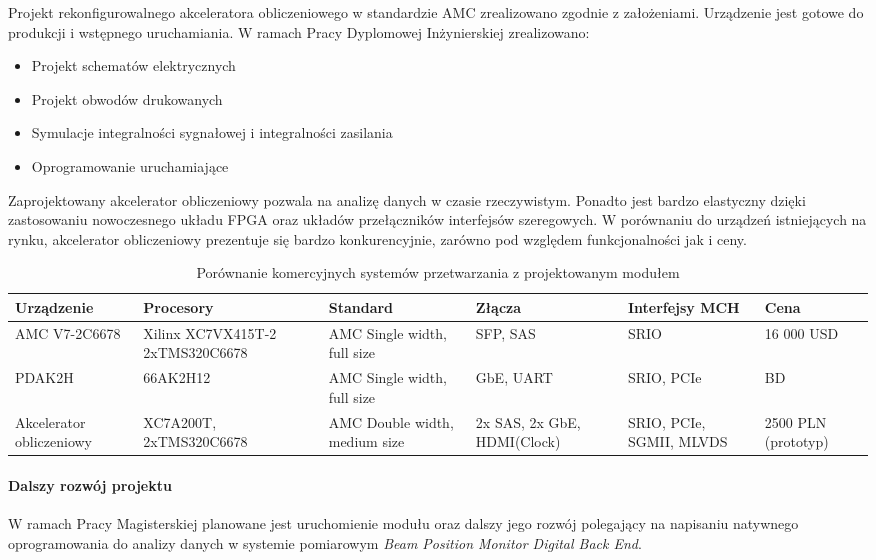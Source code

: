 

Projekt rekonfigurowalnego akceleratora obliczeniowego w standardzie AMC zrealizowano zgodnie z założeniami. Urządzenie jest gotowe do produkcji i wstępnego uruchamiania. W ramach Pracy Dyplomowej Inżynierskiej zrealizowano:
\begin{itemize}
\item
Projekt schematów elektrycznych
\item
Projekt obwodów drukowanych
\item
Symulacje integralności sygnałowej i integralności zasilania
\item
Oprogramowanie uruchamiające
\end{itemize}

Zaprojektowany akcelerator obliczeniowy pozwala na analizę danych w czasie rzeczywistym. Ponadto jest bardzo elastyczny dzięki zastosowaniu nowoczesnego układu FPGA oraz układów przełączników interfejsów szeregowych. W porównaniu do urządzeń istniejących na rynku, akcelerator obliczeniowy prezentuje się bardzo konkurencyjnie, zarówno pod względem funkcjonalności jak i ceny. 

\begin{table}[here]
\centering
\scriptsize
    \begin{tabular}{p{2.5cm}| p{2.5cm} | p{2.5cm}|p{2cm}|p{2cm}|p{1.5cm}}
	\toprule
    \textbf{Urządzenie} & \textbf{Procesory} & \textbf{Standard} & \textbf{Złącza}  & \textbf{Interfejsy MCH}  & \textbf{Cena}\\
    \midrule
    AMC V7-2C6678 	& 	Xilinx XC7VX415T-2  2xTMS320C6678  	& 	AMC Single width, full size		&	SFP, SAS		&	 	SRIO				&	16 000 USD\\
    PDAK2H 		& 	66AK2H12				  	& 	AMC Single width, full size		&	GbE, UART		&	 	SRIO, PCIe			&	BD\\
   Akcelerator obliczeniowy	&	XC7A200T, 2xTMS320C6678	&	AMC Double width, medium size	&	2x SAS, 2x GbE, HDMI(Clock)	&	SRIO, PCIe, SGMII, MLVDS	&	2500 PLN (prototyp)\\ 
     \end{tabular}
	\caption{Porównanie komercyjnych systemów przetwarzania z projektowanym modułem}
	\label{tbl:cots2}
\end{table}


\paragraph{Dalszy rozwój projektu}
W ramach Pracy Magisterskiej planowane jest uruchomienie modułu oraz dalszy jego rozwój polegający na napisaniu natywnego oprogramowania do analizy danych w systemie pomiarowym \textit{Beam Position Monitor Digital Back End}.
 